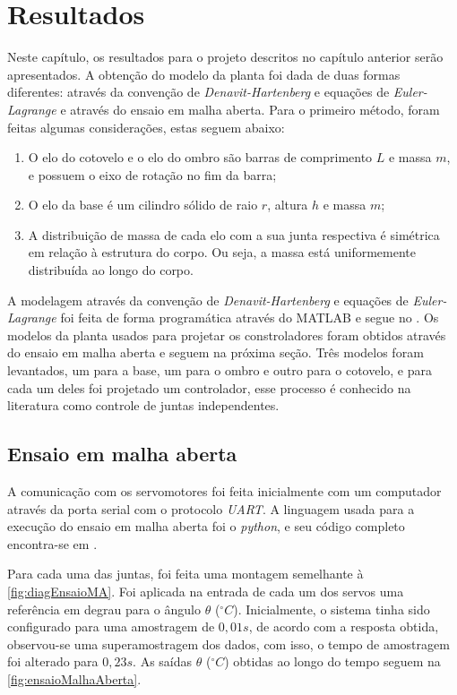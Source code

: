 \chapter{Resultados}

Neste capítulo, os resultados para o projeto descritos no capítulo anterior serão apresentados. A obtenção do modelo da 
planta foi dada de duas formas diferentes: através da convenção de \textit{Denavit-Hartenberg} e equações de 
\textit{Euler-Lagrange} e através do ensaio em malha aberta. Para o primeiro método, foram feitas algumas considerações,
estas seguem abaixo:

\begin{enumerate}
 \item O elo do cotovelo e o elo do ombro são barras de comprimento $L$ e massa $m$, e possuem o eixo de rotação no fim
 da barra;
 \item O elo da base é um cilindro sólido de raio $r$, altura $h$ e massa $m$;
 \item A distribuição de massa de cada elo com a sua junta respectiva é simétrica em relação à estrutura do corpo. Ou seja,
 a massa está uniformemente distribuída ao longo do corpo.
\end{enumerate}

A modelagem através da convenção de \textit{Denavit-Hartenberg} e equações de \textit{Euler-Lagrange} foi feita de forma
programática através do MATLAB e segue no . Os modelos da planta usados para projetar os
constroladores foram obtidos através do ensaio em malha aberta e seguem na próxima seção. Três modelos foram levantados,
um para a base, um para o ombro e outro para o cotovelo, e para cada um deles foi projetado um controlador, esse 
processo é conhecido na literatura como controle de juntas independentes.

\section{Ensaio em malha aberta}

A comunicação com os servomotores foi feita inicialmente com um computador através da porta serial com o protocolo 
\textit{UART}. A linguagem usada para a execução do ensaio em malha aberta foi o \textit{python}, e seu código completo
encontra-se em \cite{lelis_model}.

Para cada uma das juntas, foi feita uma montagem semelhante à \autoref{fig:diagEnsaioMA}. Foi aplicada na entrada de
cada um dos servos uma referência em degrau para o ângulo $\theta$ ($^\circ C$). Inicialmente, o sistema tinha sido
configurado para uma amostragem de $0,01s$, de acordo com a resposta obtida, observou-se uma superamostragem dos dados,
com isso, o tempo de amostragem foi alterado para $0,23s$. As saídas $\theta$ ($^\circ C$) obtidas
ao longo do tempo seguem na \autoref{fig:ensaioMalhaAberta}.

